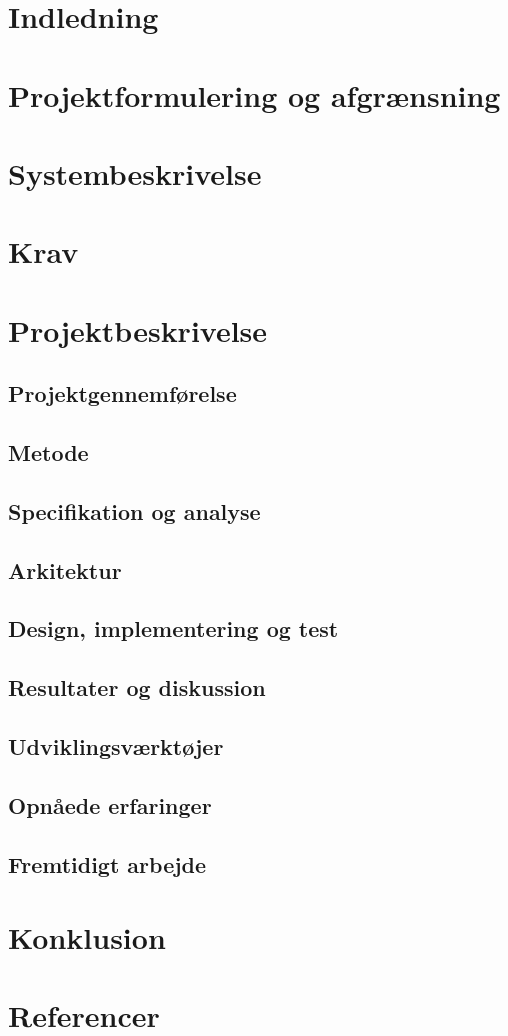 \chapter{Indledning}
\chapter{Projektformulering og afgrænsning}
\chapter{Systembeskrivelse}
\chapter{Krav}
\chapter{Projektbeskrivelse}
\section{Projektgennemførelse}
\section{Metode}
\section{Specifikation og analyse}
\section{Arkitektur}
\section{Design, implementering og test}
\section{Resultater og diskussion}
\section{Udviklingsværktøjer}
\section{Opnåede erfaringer}
\section{Fremtidigt arbejde}
\chapter{Konklusion}
\chapter{Referencer}